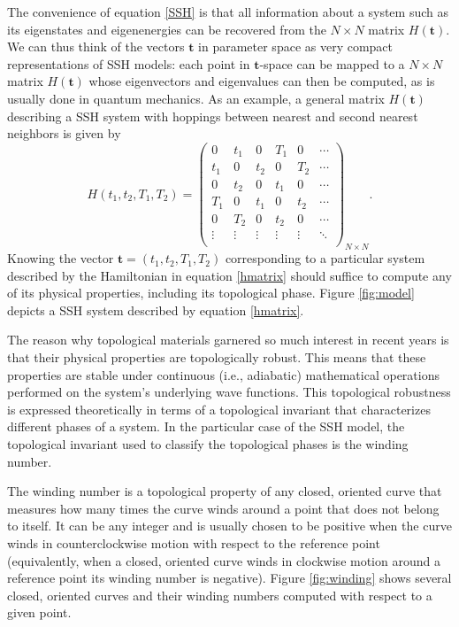 \documentclass[fleqn,10pt]{wlscirep}
\begin{document}
The convenience of equation \eqref{SSH} is that all information about a system such as its eigenstates and eigenenergies can be recovered from the $N\times N$ matrix $H(\mathbf{t})$. We can thus think of the vectors $\mathbf{t}$ in parameter space as very compact representations of SSH models: each point in $\mathbf{t}$-space can be mapped to a $N\times N$ matrix $H(\mathbf{t})$ whose eigenvectors and eigenvalues can then be computed, as is usually done in quantum mechanics. As an example, a general matrix $H(\mathbf{t})$ describing a SSH system with hoppings between nearest and second nearest neighbors is given by
\begin{equation}\label{hmatrix}
H(t_1,t_2,T_1,T_2)=\left(
  \begin{array}{cccccc}
    0 & t_1 & 0 & T_1 & 0 & \cdots \\
    t_1 & 0 & t_2& 0 & T_2 & \cdots\\
    0 & t_2 & 0 & t_1 & 0 & \cdots\\
    T_1 & 0 & t_1 & 0 & t_2 & \cdots\\
    0 & T_2 & 0 & t_2 &  0& \cdots\\
    \vdots & \vdots    & \vdots & \vdots &  \vdots & \ddots\\
  \end{array}
  \right)_{N \times N}.
\end{equation}
Knowing the vector $\mathbf{t}=(t_1,t_2,T_1,T_2)$ corresponding to a particular system described by the Hamiltonian in equation \eqref{hmatrix} should suffice to compute any of its physical properties, including its topological phase. Figure \ref{fig:model} depicts a SSH system described by equation \eqref{hmatrix}.

The reason why topological materials garnered so much interest in recent years is that their physical properties are topologically robust.
This means that these properties are stable under continuous (i.e., adiabatic) mathematical operations performed on the system's underlying wave functions. This topological robustness is expressed theoretically in terms of a topological invariant that characterizes different phases of a system. In the particular case of the SSH model, the topological invariant used to classify the topological phases is the winding number.

The winding number is a topological property of any closed, oriented curve that measures how many times the curve winds around a point that does not belong to itself. It can be any integer and is usually chosen to be positive when the curve winds in counterclockwise motion with respect to the reference point (equivalently, when a closed, oriented curve winds in clockwise motion around a reference point its winding number is negative). Figure \ref{fig:winding} shows several closed, oriented curves and their winding numbers computed with respect to a given point.
\end{document}
